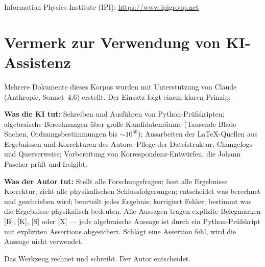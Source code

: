 \documentclass[11pt,oneside]{book}
\begin{document}
Information Physics Institute (IPI): \url{https://www.ipigroup.net}

\section*{Vermerk zur Verwendung von KI-Assistenz}

Mehrere Dokumente dieses Korpus wurden mit Unterstützung von Claude
(Anthropic, Sonnet~4.6) erstellt. Der Einsatz folgt einem klaren Prinzip:

\textbf{Was die KI tut:} Schreiben und Ausführen von Python-Prüfskripten;
algebraische Berechnungen über große Kandidatenräume (Tausende Blade-Suchen,
Ordnungsbestimmungen bis $\sim 10^{30}$); Ausarbeiten der \LaTeX-Quellen
aus Ergebnissen und Korrekturen des Autors; Pflege der Dateistruktur,
Changelogs und Querverweise; Vorbereitung von Korrespondenz-Entwürfen,
die Johann Pascher prüft und freigibt.

\textbf{Was der Autor tut:} Stellt alle Forschungsfragen; liest alle
Ergebnisse Korrektur; zieht alle physikalischen Schlussfolgerungen; entscheidet
was berechnet und geschrieben wird; beurteilt jedes Ergebnis; korrigiert
Fehler; bestimmt was die Ergebnisse physikalisch bedeuten. Alle Aussagen
tragen explizite Belegmarken [B], [K], [S] oder [X] --- jede algebraische
Aussage ist durch ein Python-Prüfskript mit expliziten Assertions abgesichert.
Schlägt eine Assertion fehl, wird die Aussage nicht verwendet.

Das Werkzeug rechnet und schreibt. Der Autor entscheidet.
\end{document}

